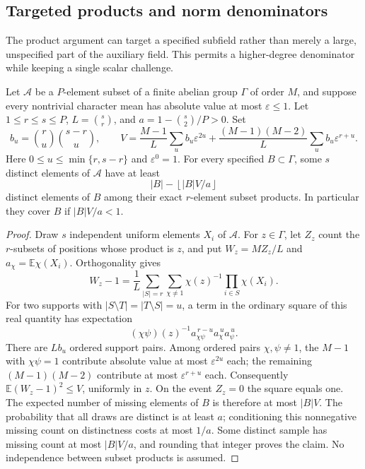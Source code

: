 \subsection{Targeted products and norm denominators}
\label{subsec:target-subset-norm-compiler}

The product argument can target a specified subfield rather than merely
a large, unspecified part of the auxiliary field.  This permits a
higher-degree denominator while keeping a single scalar challenge.

\begin{lemma}
\label{lem:target-subset-product-moment}
Let $\mathcal A$ be a $P$-element subset of a finite abelian group
$\Gamma$ of order $M$, and suppose every nontrivial character mean
has absolute value at most $\varepsilon\le1$.  Let
$1\le r\le s\le P$, $L=\binom sr$, and
$a=1-\binom s2/P>0$.  Set
\[
 b_u=\binom ru\binom{s-r}u,\qquad
 V=\frac{M-1}{L}\sum_u b_u\varepsilon^{2u}
   +\frac{(M-1)(M-2)}{L}\sum_u b_u\varepsilon^{r+u}.
\]
Here $0\le u\le\min\{r,s-r\}$ and $\varepsilon^0=1$.
For every specified $B\subset\Gamma$, some $s$ distinct elements
of $\mathcal A$ have at least
\[
 |B|-\left\lfloor |B|V/a\right\rfloor
\]
distinct elements of $B$ among their exact $r$-element subset products.
In particular they cover $B$ if $|B|V/a<1$.
\end{lemma}
\begin{proof}
Draw $s$ independent uniform elements $X_i$ of $\mathcal A$.
For $z\in\Gamma$, let $Z_z$ count the $r$-subsets of positions whose
product is $z$, and put $W_z=MZ_z/L$ and
$a_\chi=\mathbb E\chi(X_i)$.  Orthogonality gives
\[
 W_z-1=\frac1L\sum_{|S|=r}\sum_{\chi\ne1}
          \chi(z)^{-1}\prod_{i\in S}\chi(X_i).
\]
For two supports with $|S\setminus T|=|T\setminus S|=u$, a term
in the ordinary square of this real quantity has expectation
\[
 (\chi\psi)(z)^{-1}
 a_{\chi\psi}^{\,r-u}a_\chi^{\,u}a_\psi^{\,u}.
\]
There are $Lb_u$ ordered support pairs.  Among ordered pairs
$\chi,\psi\ne1$, the $M-1$ with $\chi\psi=1$ contribute absolute
value at most $\varepsilon^{2u}$ each; the remaining
$(M-1)(M-2)$ contribute at most $\varepsilon^{r+u}$ each.
Consequently $\mathbb E(W_z-1)^2\le V$, uniformly in $z$.
On the event $Z_z=0$ the square equals one.  The expected number of
missing elements of $B$ is therefore at most $|B|V$.
The probability that all draws are distinct is at least $a$; conditioning
this nonnegative missing count on distinctness costs at most $1/a$.
Some distinct sample has missing count at most $|B|V/a$, and rounding
that integer proves the claim.  No independence between subset products
is assumed.
\end{proof}

